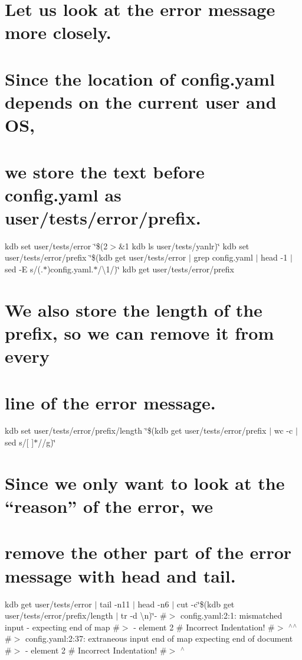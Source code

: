 \section*{Let us look at the error message more closely.}

\section*{Since the location of {\ttfamily config.\+yaml} depends on the current user and OS,}

\section*{we store the text before {\ttfamily config.\+yaml} as {\ttfamily user/tests/error/prefix}.}

kdb set user/tests/error \char`\"{}\$(2$>$\&1 kdb ls user/tests/yanlr)\char`\"{} kdb set user/tests/error/prefix \char`\"{}\$(kdb get user/tests/error $\vert$ grep \textquotesingle{}config.\+yaml\textquotesingle{} $\vert$ head -\/1 $\vert$ sed -\/\+E \textquotesingle{}s/(.$\ast$)config.\+yaml.$\ast$/\textbackslash{}1/\textquotesingle{})\char`\"{} kdb get user/tests/error/prefix \section*{We also store the length of the prefix, so we can remove it from every}

\section*{line of the error message.}

kdb set user/tests/error/prefix/length \char`\"{}\$(kdb get user/tests/error/prefix $\vert$ wc -\/c $\vert$ sed \textquotesingle{}s/\mbox{[} \mbox{]}$\ast$//g\textquotesingle{})\char`\"{}

\section*{Since we only want to look at the “reason” of the error, we}

\section*{remove the other part of the error message with {\ttfamily head} and {\ttfamily tail}.}

kdb get user/tests/error $\vert$ tail -\/n11 $\vert$ head -\/n6 $\vert$ cut -\/c\char`\"{}\$(kdb get user/tests/error/prefix/length $\vert$ tr -\/d \textquotesingle{}\textbackslash{}n\textquotesingle{})\char`\"{}-\/ \#$>$ config.\+yaml\+:2\+:1\+: mismatched input \textquotesingle{}-\/ \textquotesingle{} expecting end of map \#$>$ -\/ element 2 \# Incorrect Indentation! \#$>$ $^\wedge$$^\wedge$ \#$>$ config.\+yaml\+:2\+:37\+: extraneous input \textquotesingle{}end of map\textquotesingle{} expecting end of document \#$>$ -\/ element 2 \# Incorrect Indentation! \#$>$ $^\wedge$

